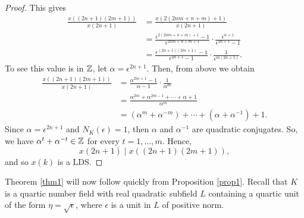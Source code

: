 \documentclass[11pt]{amsart}
\begin{document}
\begin{prop}
\begin{proof}
This gives
\begin{align*}
\frac{x((2n+1)(2m+1))}{x(2n+1)}	&= \frac{x(2(2nm+n+m)+1)}{x(2n+1)}\\
						&= \frac{\epsilon^{2(2nm+n+m)+1}-1}{\epsilon^{2nm+n+m+1}} \cdot \frac{\epsilon^{n+1}}{\epsilon^{2n+1}-1}\\
						&=\frac{\epsilon^{(2n+1)(2m+1)}-1}{\epsilon^{2n+1}-1} \cdot \frac{1}{\epsilon^{m(2n+1)}}.
\end{align*}
To see this value is in $\mathbb{Z}$, let $\alpha=\epsilon^{2n+1}$. Then, from above we obtain
\begin{align*}
\frac{x((2n+1)(2m+1))}{x(2n+1)} &= \frac{\alpha^{2m+1}-1}{\alpha-1} \cdot \frac{1}{\alpha^m}\\
					&=\frac{\alpha^{2m}+\alpha^{2m-1}+\cdots+\alpha+1}{\alpha^m}\\
					&= (\alpha^m+\alpha^{-m})+\cdots+(\alpha+\alpha^{-1})+1.
\end{align*}
Since $\alpha=\epsilon^{2n+1}$ and $N_K(\epsilon)=1$, then $\alpha$ and $\alpha^{-1}$ are quadratic conjugates. So, we have
$\alpha^t+\alpha^{-t} \in \mathbb{Z}$
for every $t=1, \dots, m$. Hence, \[x(2n+1) \mid x((2n+1)(2m+1)),\] and so $x(k)$ is a LDS.
\end{proof}
\end{prop}

Theorem \ref{thm1} will now follow quickly from Proposition \ref{prop1}. Recall that $K$ is a quartic number field with real quadratic subfield $L$ containing a quartic unit of the form $\eta=\sqrt{\epsilon}$, where $\epsilon$ is a unit in $L$ of positive norm.
\end{document}
